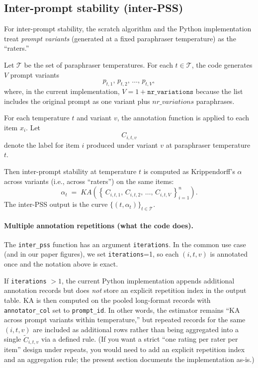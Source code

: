 \subsection{Inter-prompt stability (inter-PSS)}

For inter-prompt stability, the scratch algorithm and the Python implementation treat \emph{prompt variants} (generated at a fixed paraphraser temperature) as the ``raters.''

Let $\mathcal{T}$ be the set of paraphraser temperatures. For each $t\in\mathcal{T}$, the code generates $V$ prompt variants
\[
p_{t,1},\, p_{t,2},\, \ldots,\, p_{t,V},
\]
where, in the current implementation, $V = 1 + \texttt{nr\_variations}$ because the list includes the original prompt as one variant plus $nr\_variations$ paraphrases.

For each temperature $t$ and variant $v$, the annotation function is applied to each item $x_i$. Let
\[
C_{i,t,v}
\]
denote the label for item $i$ produced under variant $v$ at paraphraser temperature $t$.

Then inter-prompt stability at temperature $t$ is computed as Krippendorff's $\alpha$ across variants (i.e., across ``raters'') on the same items:
\[
\alpha_t
\;=\;
KA\!\left(
\left\{\, C_{i,t,1},\, C_{i,t,2},\, \ldots,\, C_{i,t,V} \,\right\}_{i=1}^{n}
\right).
\]
The inter-PSS output is the curve $\{(t,\alpha_t)\}_{t\in\mathcal{T}}$.

\paragraph{Multiple annotation repetitions (what the code does).}
The \texttt{inter\_pss} function has an argument \texttt{iterations}. In the common use case (and in our paper figures), we set \texttt{iterations}=1, so each $(i,t,v)$ is annotated once and the notation above is exact.

If \texttt{iterations} $>1$, the current Python implementation appends additional annotation records but does \emph{not} store an explicit repetition index in the output table. KA is then computed on the pooled long-format records with \texttt{annotator\_col} set to \texttt{prompt\_id}. In other words, the estimator remains ``KA across prompt variants within temperature,'' but repeated records for the same $(i,t,v)$ are included as additional rows rather than being aggregated into a single $\widetilde{C}_{i,t,v}$ via a defined rule. (If you want a strict ``one rating per rater per item'' design under repeats, you would need to add an explicit repetition index and an aggregation rule; the present section documents the implementation as-is.)

